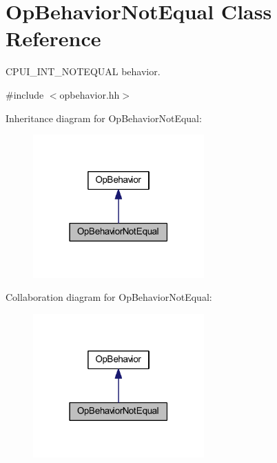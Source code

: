 \hypertarget{class_op_behavior_not_equal}{}\section{Op\+Behavior\+Not\+Equal Class Reference}
\label{class_op_behavior_not_equal}


C\+P\+U\+I\+\_\+\+I\+N\+T\+\_\+\+N\+O\+T\+E\+Q\+U\+AL behavior.  




{\ttfamily \#include $<$opbehavior.\+hh$>$}



Inheritance diagram for Op\+Behavior\+Not\+Equal\+:
\nopagebreak
\begin{figure}[H]
\begin{center}
\leavevmode
\includegraphics[width=186pt]{class_op_behavior_not_equal__inherit__graph}
\end{center}
\end{figure}


Collaboration diagram for Op\+Behavior\+Not\+Equal\+:
\nopagebreak
\begin{figure}[H]
\begin{center}
\leavevmode
\includegraphics[width=186pt]{class_op_behavior_not_equal__coll__graph}
\end{center}
\end{figure}
